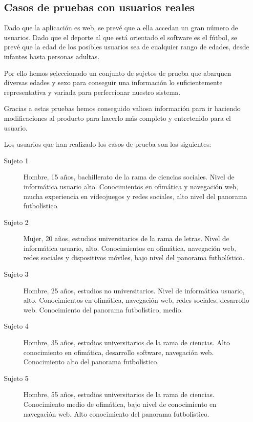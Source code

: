 
\subsection{Casos de pruebas con usuarios reales}
Dado que la aplicación es web, se prevé que a ella accedan un gran número de
usuarios. Dado que el deporte al que está orientado el software es el fútbol, se
prevé que la edad de los posibles usuarios sea de cualquier rango de edades,
desde infantes hasta personas adultas.

Por ello hemos seleccionado un conjunto de sujetos de prueba que abarquen
diversas edades y sexo para conseguir una información lo suficientemente
representativa y variada para perfeccionar nuestro sistema.

Gracias a estas pruebas hemos conseguido valiosa información para ir haciendo
modificaciones al producto para hacerlo más completo y entretenido para el
usuario.

Los usuarios que han realizado los casos de prueba son los siguientes:

\begin{description}
\item[Sujeto 1] Hombre, 15 años, bachillerato de la rama de ciencias
  sociales. Nivel de informática usuario alto. Conocimientos en ofimática y
  navegación web, mucha experiencia en videojuegos y redes sociales, alto nivel
  del panorama futbolístico.
\item[Sujeto 2] Mujer, 20 años, estudios universitarios de la rama de
  letras. Nivel de informática usuario, alto. Conocimientos en ofimática,
  navegación web, redes sociales y dispositivos móviles, bajo nivel del panorama futbolístico.
\item[Sujeto 3] Hombre, 25 años, estudios no universitarios. Nivel de
  informática usuario, alto. Conocimientos en ofimática, navegación web, redes
  sociales, desarrollo web. Conocimiento del panorama futbolístico, medio.
\item[Sujeto 4] Hombre, 35 años, estudios universitarios de la rama de
  ciencias. Alto conocimiento en ofimática, desarrollo software, navegación
  web. Conocimiento alto del panorama futbolístico.
\item[Sujeto 5] Hombre, 55 años, estudios universitarios de la rama de
  ciencias. Conocimiento medio de ofimática, bajo nivel de conocimiento en
  navegación web. Alto conocimiento del panorama futbolístico.
\end{description}

